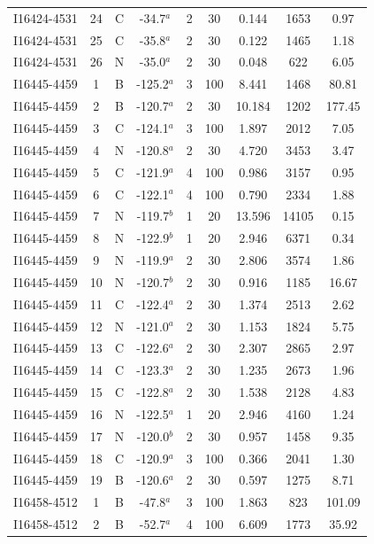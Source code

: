\begin{table}
\begin{tabular}{ccccccccc}
I16424-4531 & 24 & C & -34.7$^{a}$ & 2 & 30 & 0.144 & 1653 & 0.97 \\
I16424-4531 & 25 & C & -35.8$^{a}$ & 2 & 30 & 0.122 & 1465 & 1.18 \\
I16424-4531 & 26 & N & -35.0$^{a}$ & 2 & 30 & 0.048 & 622 & 6.05 \\
I16445-4459 & 1 & B & -125.2$^{a}$ & 3 & 100 & 8.441 & 1468 & 80.81 \\
I16445-4459 & 2 & B & -120.7$^{a}$ & 2 & 30 & 10.184 & 1202 & 177.45 \\
I16445-4459 & 3 & C & -124.1$^{a}$ & 3 & 100 & 1.897 & 2012 & 7.05 \\
I16445-4459 & 4 & N & -120.8$^{a}$ & 2 & 30 & 4.720 & 3453 & 3.47 \\
I16445-4459 & 5 & C & -121.9$^{a}$ & 4 & 100 & 0.986 & 3157 & 0.95 \\
I16445-4459 & 6 & C & -122.1$^{a}$ & 4 & 100 & 0.790 & 2334 & 1.88 \\
I16445-4459 & 7 & N & -119.7$^{b}$ & 1 & 20 & 13.596 & 14105 & 0.15 \\
I16445-4459 & 8 & N & -122.9$^{b}$ & 1 & 20 & 2.946 & 6371 & 0.34 \\
I16445-4459 & 9 & N & -119.9$^{a}$ & 2 & 30 & 2.806 & 3574 & 1.86 \\
I16445-4459 & 10 & N & -120.7$^{b}$ & 2 & 30 & 0.916 & 1185 & 16.67 \\
I16445-4459 & 11 & C & -122.4$^{a}$ & 2 & 30 & 1.374 & 2513 & 2.62 \\
I16445-4459 & 12 & N & -121.0$^{a}$ & 2 & 30 & 1.153 & 1824 & 5.75 \\
I16445-4459 & 13 & C & -122.6$^{a}$ & 2 & 30 & 2.307 & 2865 & 2.97 \\
I16445-4459 & 14 & C & -123.3$^{a}$ & 2 & 30 & 1.235 & 2673 & 1.96 \\
I16445-4459 & 15 & C & -122.8$^{a}$ & 2 & 30 & 1.538 & 2128 & 4.83 \\
I16445-4459 & 16 & N & -122.5$^{a}$ & 1 & 20 & 2.946 & 4160 & 1.24 \\
I16445-4459 & 17 & N & -120.0$^{b}$ & 2 & 30 & 0.957 & 1458 & 9.35 \\
I16445-4459 & 18 & C & -120.9$^{a}$ & 3 & 100 & 0.366 & 2041 & 1.30 \\
I16445-4459 & 19 & B & -120.6$^{a}$ & 2 & 30 & 0.597 & 1275 & 8.71 \\
I16458-4512 & 1 & B & -47.8$^{a}$ & 3 & 100 & 1.863 & 823 & 101.09 \\
I16458-4512 & 2 & B & -52.7$^{a}$ & 4 & 100 & 6.609 & 1773 & 35.92 \\

\end{tabular}
\end{table}
